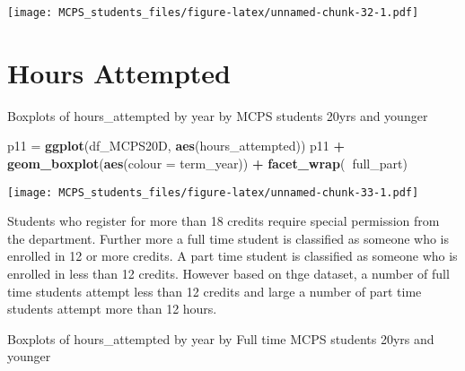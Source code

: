 \documentclass[]{article}
\newenvironment{Shaded}{\begin{snugshade}}{\end{snugshade}}
\newcommand{\DataTypeTok}[1]{\textcolor[rgb]{0.13,0.29,0.53}{#1}}
\newcommand{\KeywordTok}[1]{\textcolor[rgb]{0.13,0.29,0.53}{\textbf{#1}}}
\newcommand{\NormalTok}[1]{#1}
\newcommand{\OperatorTok}[1]{\textcolor[rgb]{0.81,0.36,0.00}{\textbf{#1}}}
\newcommand{\StringTok}[1]{\textcolor[rgb]{0.31,0.60,0.02}{#1}}
\begin{document}
\texttt{[image: MCPS\_students\_files/figure-latex/unnamed-chunk-32-1.pdf]}

\hypertarget{hours-attempted}{%
\section{Hours Attempted}\label{hours-attempted}}

Boxplots of hours\_attempted by year by MCPS students 20yrs and younger

\begin{Shaded}
\begin{Highlighting}[]
\NormalTok{p11 =}\StringTok{ }\KeywordTok{ggplot}\NormalTok{(df_MCPS20D, }\KeywordTok{aes}\NormalTok{(hours_attempted))}
\NormalTok{p11 }\OperatorTok{+}\StringTok{ }\KeywordTok{geom_boxplot}\NormalTok{(}\KeywordTok{aes}\NormalTok{(}\DataTypeTok{colour =}\NormalTok{ term_year)) }\OperatorTok{+}
\StringTok{       }\KeywordTok{facet_wrap}\NormalTok{(}\OperatorTok{~}\NormalTok{full_part)}
\end{Highlighting}
\end{Shaded}

\texttt{[image: MCPS\_students\_files/figure-latex/unnamed-chunk-33-1.pdf]}

Students who register for more than 18 credits require special
permission from the department. Further more a full time student is
classified as someone who is enrolled in 12 or more credits. A part time
student is classified as someone who is enrolled in less than 12
credits. However based on thge dataset, a number of full time students
attempt less than 12 credits and large a number of part time students
attempt more than 12 hours.

Boxplots of hours\_attempted by year by Full time MCPS students 20yrs
and younger

\begin{Shaded}
\end{Shaded}
\end{document}

